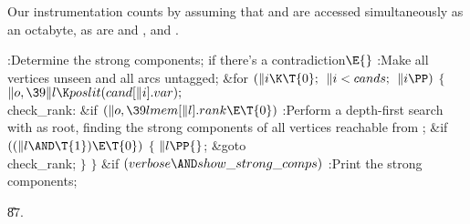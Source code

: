 Our instrumentation counts  by assuming that  and %
 are
accessed simultaneously as an octabyte, as are  and ,
 and .

\Y\B\4:Determine the strong components;  if
there's a contradiction\X${}\E{}$\6
:Make all vertices unseen and all arcs untagged\X;\6
\&{for} ${}(\|i\K\T{0};{}$ ${}\|i<\\{cands};{}$ ${}\|i\PP){}$\5
${}\{{}$\1\6
${}\|o,\39\|l\K\\{poslit}(\\{cand}[\|i].\\{var});{}$\6
\4\\{check\_rank}:\5
\&{if} ${}(\|o,\39\\{lmem}[\|l].\\{rank}\E\T{0}){}$\1\5
:Perform a depth-first search with  as root, finding the strong
components of all vertices reachable from \X;\2\6
\&{if} ${}((\|l\AND\T{1})\E\T{0}){}$\5
${}\{{}$\1\6
${}\|l\PP{}$;\5
\&{goto} \\{check\_rank};\6
\4${}\}{}$\2\6
\4${}\}{}$\2\6
\&{if} ${}(\\{verbose}\AND\\{show\_strong\_comps}){}$\1\5
:Print the strong components\X;\2\par
\U87.\fi

